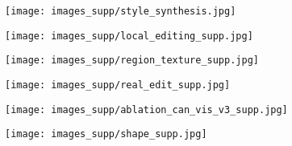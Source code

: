 \documentclass[acmtog]{acmart}
\begin{document}
\begin{figure*}[b]
  \centering
  \texttt{[image: images\_supp/style\_synthesis.jpg]}
  \caption{}
  \Description{}
  \label{fig:global_editing}
\end{figure*}



\begin{figure*}[b]
  \centering
  \texttt{[image: images\_supp/local\_editing\_supp.jpg]}
  \caption{}
  \Description{}
  \label{fig:local_editing}
\end{figure*}




\begin{figure*}[b]
  \centering
  \texttt{[image: images\_supp/region\_texture\_supp.jpg]}
  \caption{}
  \Description{}
  \label{fig:texture_editing}
\end{figure*}

\begin{figure*}[b]
  \centering
  \texttt{[image: images\_supp/real\_edit\_supp.jpg]}
  \caption{}
  \Description{}
  \label{fig:real_editing}
\end{figure*}


\begin{figure*}[b]
  \centering
  \texttt{[image: images\_supp/ablation\_can\_vis\_v3\_supp.jpg]}
  \caption{}
  \Description{}
  \label{fig:ablation_canonical}
\end{figure*}

\begin{figure*}[b]
  \centering
  \texttt{[image: images\_supp/shape\_supp.jpg]}
  \caption{}
  \Description{}
  \label{fig:shape}
\end{figure*}






%
 
\end{document}
